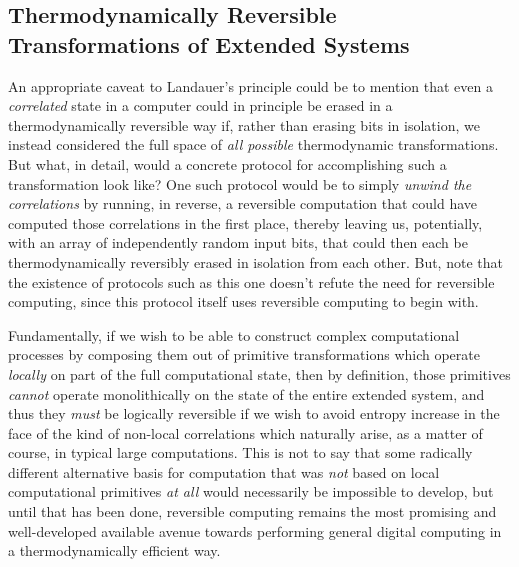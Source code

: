 \documentclass[preprints,article,accept,moreauthors,pdftex]{Definitions/mdpi}
\begin{document}
\begin{paracol}{2}
\subsection{Thermodynamically Reversible Transformations of Extended Systems}
\label{ssec:extend}

An appropriate caveat to Landauer's principle could be to mention that %
even a \emph{correlated} state in a computer could in principle be erased in a thermodynamically reversible way if, rather than erasing bits in isolation, we instead considered the full space of \emph{all possible} thermodynamic transformations.  But what, in detail, would a concrete protocol for accomplishing such a transformation look like?  One such protocol would be to simply \emph{unwind the correlations} by running, in reverse, a reversible computation that could have computed those correlations in the first place, thereby leaving us, potentially, with an array of independently random input bits, that could then each be thermodynamically reversibly erased in isolation from each other.  But, note that the existence of protocols such as this one doesn't refute the need for reversible computing, since this protocol itself uses reversible computing to begin with.  

Fundamentally, if we wish to be able to construct complex computational processes by composing them out of primitive transformations which operate \textit{locally} on part of the full computational state, then by definition, those primitives \emph{cannot} operate monolithically on the state of the entire extended system, and thus they \emph{must} be logically reversible if we wish to avoid entropy increase in the face of the kind of non-local correlations which naturally arise, as a matter of course, in typical large computations.  This is not to say that some radically different alternative basis for computation that was \emph{not} based on local computational primitives \emph{at all} would necessarily be impossible to develop, but until that has been done, reversible computing remains the most promising and well-developed available avenue towards performing general digital computing in a thermodynamically efficient way.


\end{paracol}
\end{document}

